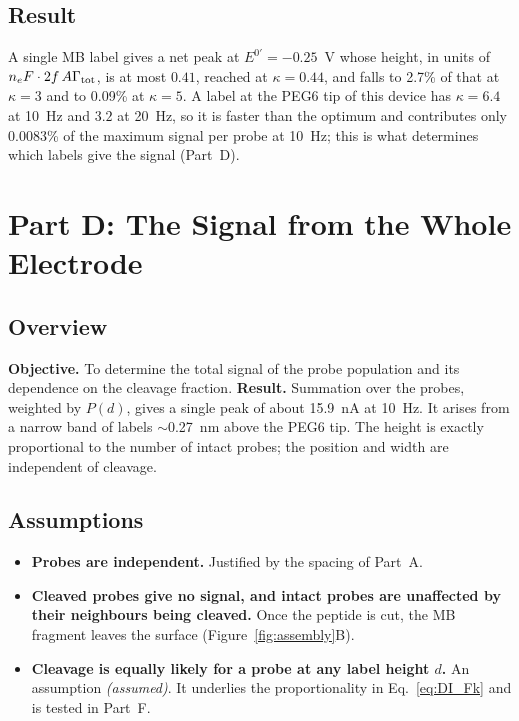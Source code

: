 \documentclass[10pt,a4paper]{article}
\numberwithin{equation}{section}
\newcommand{\Grtot}{\Gamma_{\rm tot}}
\newcommand{\Eform}{E^{0\prime}}
\newcommand{\FLAG}{\textit{(assumed)}}
\newcommand{\figref}[1]{Figure~\ref{#1}}
\newenvironment{assump}{\small}{\smallskip}
\newcommand{\dStarTenOff}{0.27}
\newcommand{\gFivePct}{0.09}
\newcommand{\gMax}{0.41}
\newcommand{\gThreePct}{2.7}
\newcommand{\gTipPct}{0.0083}
\newcommand{\kappaMax}{0.44}
\newcommand{\kappaTenHz}{6.4}
\newcommand{\kappaTwentyHz}{3.2}
\newcommand{\peakNA}{15.9}
\begin{document}
\subsection{Result}

A single MB label gives a net peak at $\Eform=-0.25$~V whose height, in units of
$n_eF\cdot2f\,A\Grtot$, is at most $\gMax$, reached at $\kappa=\kappaMax$, and falls to \gThreePct\% of that at $\kappa=3$ and to
\gFivePct\% at $\kappa=5$. A label at the PEG6 tip of this device has $\kappa=\kappaTenHz$ at
10~Hz and $\kappaTwentyHz$ at 20~Hz, so it is faster than the optimum and contributes only \gTipPct\% of the maximum signal per probe at 10~Hz; this is what
determines which labels give the signal (Part~D).

\section{Part D: The Signal from the Whole Electrode}
\label{sec:avg}

\subsection{Overview}

\textbf{Objective.} To determine the total signal of the probe population and its dependence
on the cleavage fraction. \textbf{Result.} Summation over the probes, weighted by $P(d)$, gives a single
peak of about \peakNA~nA at 10~Hz. It arises from a narrow band of labels $\sim$\dStarTenOff~nm above
the PEG6 tip. The height is exactly proportional to the number of intact probes; the position and
width are independent of cleavage.

\subsection{Assumptions}

\begin{assump}
\begin{itemize}[leftmargin=*]
\item \textbf{Probes are independent.} Justified by the spacing of Part~A.
\item \textbf{Cleaved probes give no signal, and intact probes are unaffected by their
  neighbours being cleaved.} Once the peptide is cut, the MB fragment leaves the surface (\figref{fig:assembly}B).
\item \textbf{Cleavage is equally likely for a probe at any label height $d$.} An
  assumption \FLAG. It underlies the proportionality in Eq.~\eqref{eq:DI_Fk} and is tested in
  Part~F.
\end{itemize}
\end{assump}
\end{document}

